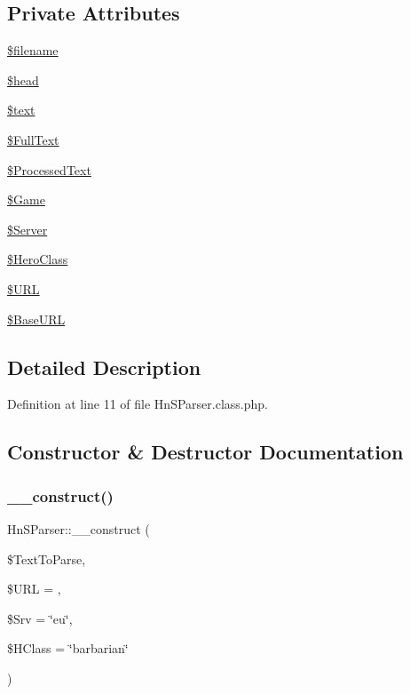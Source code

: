 \subsection*{Private Attributes}
\begin{DoxyCompactItemize}
\item 
\hyperlink{class_hn_s_parser_aaf37f9e6c5ffc96136a65a703a99aa8e}{\$filename}
\item 
\hyperlink{class_hn_s_parser_a38166aacff8c20cfd58724af3e3245b9}{\$head}
\item 
\hyperlink{class_hn_s_parser_ab72334b282b41e35cae1b894dedf550e}{\$text}
\item 
\hyperlink{class_hn_s_parser_aa71c0a545d019cb199a4b78fbbc8b5a3}{\$\+Full\+Text}
\item 
\hyperlink{class_hn_s_parser_ac36ceaff377f48bfae25db17a0c45b9a}{\$\+Processed\+Text}
\item 
\hyperlink{class_hn_s_parser_a21e435563e56096b95d0e4e225cab626}{\$\+Game}
\item 
\hyperlink{class_hn_s_parser_a8ec5690da557329c2eaa9c2a72358950}{\$\+Server}
\item 
\hyperlink{class_hn_s_parser_a54e8df1596691e3b035ad689b3fad9ca}{\$\+Hero\+Class}
\item 
\hyperlink{class_hn_s_parser_ab52651f9df7dd341c91224a0ebd1e40b}{\$\+U\+RL}
\item 
\hyperlink{class_hn_s_parser_a5ffc8f527494e16b7398c22b3083b701}{\$\+Base\+U\+RL}
\end{DoxyCompactItemize}


\subsection{Detailed Description}


Definition at line 11 of file Hn\+S\+Parser.\+class.\+php.



\subsection{Constructor \& Destructor Documentation}
\mbox{\label{class_hn_s_parser_a609c801ee8a446c2de537155579f0c9b}} 
\subsubsection{\texorpdfstring{\+\_\+\+\_\+construct()}{\_\_construct()}}
{\footnotesize\ttfamily Hn\+S\+Parser\+::\+\_\+\+\_\+construct (\begin{DoxyParamCaption}\item[{}]{\$\+Text\+To\+Parse,  }\item[{}]{\$\+U\+RL = {\ttfamily \textquotesingle{}\textquotesingle{}},  }\item[{}]{\$\+Srv = {\ttfamily \char`\"{}eu\char`\"{}},  }\item[{}]{\$\+H\+Class = {\ttfamily \char`\"{}barbarian\char`\"{}} }\end{DoxyParamCaption})}

